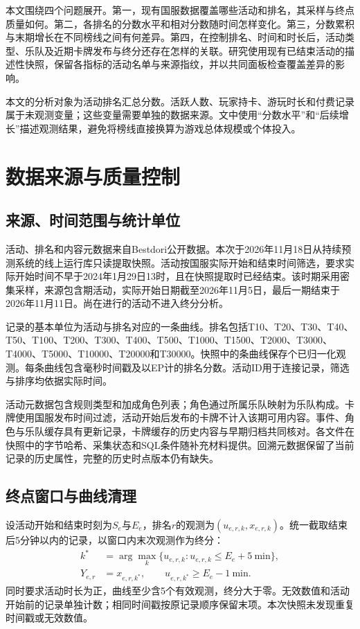 \documentclass[preprint,12pt]{elsarticle}
\begin{document}
本文围绕四个问题展开。第一，现有国服数据覆盖哪些活动和排名，其采样与终点质量如何。第二，各排名的分数水平和相对分数随时间怎样变化。第三，分数累积与末期增长在不同榜线之间有何差异。第四，在控制排名、时间和时长后，活动类型、乐队及近期卡牌发布与终分还存在怎样的关联。研究使用现有已结束活动的描述性快照，保留各指标的活动名单与来源指纹，并以共同面板检查覆盖差异的影响。

本文的分析对象为活动排名汇总分数。活跃人数、玩家持卡、游玩时长和付费记录属于未观测变量；这些变量需要单独的数据来源。文中使用“分数水平”和“后续增长”描述观测结果，避免将榜线直接换算为游戏总体规模或个体投入。

\section{数据来源与质量控制}

\subsection{来源、时间范围与统计单位}

活动、排名和内容元数据来自Bestdori公开数据\citep{bestdori2026}。本次于2026年11月18日从持续预测系统的线上运行库只读提取快照。活动按国服实际开始和结束时间筛选，要求实际开始时间不早于2024年1月29日13时，且在快照提取时已经结束。该时期采用密集采样，来源包含\NumEvents{}期活动，实际开始日期截至2026年11月5日，最后一期结束于2026年11月11日。尚在进行的活动不进入终分分析。

记录的基本单位为活动与排名对应的一条曲线。排名包括T10、T20、T30、T40、T50、T100、T200、T300、T400、T500、T1000、T1500、T2000、T3000、T4000、T5000、T10000、T20000和T30000。快照中的\NumSourceCurves{}条曲线保存\NumPoints{}个已归一化观测。每条曲线包含毫秒时间戳及以EP计的排名分数。活动ID用于连接记录，筛选与排序均依据实际时间。

活动元数据包含规则类型和加成角色列表；角色通过所属乐队映射为乐队构成。卡牌使用国服发布时间过滤，活动开始后发布的卡牌不计入该期可用内容。事件、角色与乐队缓存具有更新记录，卡牌缓存的历史内容与早期归档共同核对。各文件在快照中的字节哈希、采集状态和SQL条件随补充材料提供。回溯元数据保留了当前记录的历史属性，完整的历史时点版本仍有缺失。



\subsection{终点窗口与曲线清理}

设活动开始和结束时刻为\(S_e\)与\(E_e\)，排名\(r\)的观测为\((u_{e,r,k},x_{e,r,k})\)。统一截取结束后5分钟以内的记录，以窗口内末次观测作为终分：
\begin{equation}\label{eq:terminal}
\begin{aligned}
k^*&=\arg\max_k\{u_{e,r,k}:u_{e,r,k}\leq E_e+5\ \mathrm{min}\},\\
Y_{e,r}&=x_{e,r,k^*},\qquad
u_{e,r,k^*}\geq E_e-1\ \mathrm{min}.
\end{aligned}
\end{equation}
同时要求活动时长为正，曲线至少含5个有效观测，终分大于零。无效数值和活动开始前的记录单独计数；相同时间戳按原记录顺序保留末项。本次快照未发现重复时间戳或无效数值。
\end{document}
